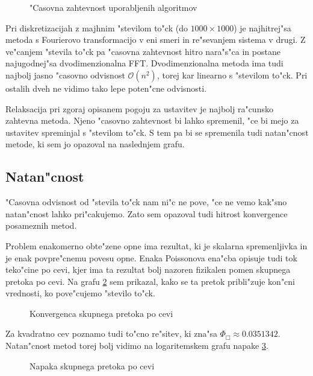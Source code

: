 \documentclass[a4paper,10pt]{article}
\begin{document}
\begin{figure}[H]

\caption{"Casovna zahtevnost uporabljenih algoritmov}
\label{fig:hitrost}  
\end{figure}

Pri diskretizacijah z majhnim "stevilom to"ck (do $1000 \times 1000$) je najhitrej"sa metoda s Fourierovo transformacijo v eni smeri in re"sevanjem sistema v drugi. Z ve"canjem "stevila to"ck pa "casovna zahtevnost hitro nara"s"ca in postane najugodnej"sa dvodimenzionalna FFT. Dvodimenzionalna metoda ima tudi najbolj jasno "casovno odvisnost $\mathcal{O}(n^2)$, torej kar linearno s "stevilom to"ck. Pri ostalih dveh ne vidimo tako lepe poten"cne odvisnosti. 

Relaksacija pri zgoraj opisanem pogoju za ustavitev je najbolj ra"cunsko zahtevna metoda. Njeno "casovno zahtevnost bi lahko spremenil, "ce bi mejo za ustavitev spreminjal s "stevilom to"ck. S tem pa bi se spremenila tudi natan"cnost metode, ki sem jo opazoval na naslednjem grafu. 

\subsection{Natan"cnost}

"Casovna odvisnost od "stevila to"ck nam ni"c ne pove, "ce ne vemo kak"sno natan"cnost lahko pri"cakujemo. Zato sem opazoval tudi hitrost konvergence posameznih metod. 

Problem enakomerno obte"zene opne ima rezultat, ki je skalarna spremenljivka in je enak povpre"cnemu povesu opne. Enaka Poissonova ena"cba opisuje tudi tok teko"cine po cevi, kjer ima ta rezultat bolj nazoren fizikalen pomen skupnega pretoka po cevi. Na grafu \ref{fig:pretok} sem prikazal, kako se ta pretok pribli"zuje kon"cni vrednosti, ko pove"cujemo "stevilo to"ck. 

\begin{figure}[H]

\caption{Konvergenca skupnega pretoka po cevi}
\label{fig:pretok}  
\end{figure}

Za kvadratno cev poznamo tudi to"cno re"sitev, ki zna"sa $\Phi_\Box \approx 0.0351342$. Natan"cnost metod torej bolj vidimo na logaritemskem grafu napake \ref{fig:pretok-log}. 

\begin{figure}[H]

\caption{Napaka skupnega pretoka po cevi}
\label{fig:pretok-log}  
\end{figure}
\end{document}
